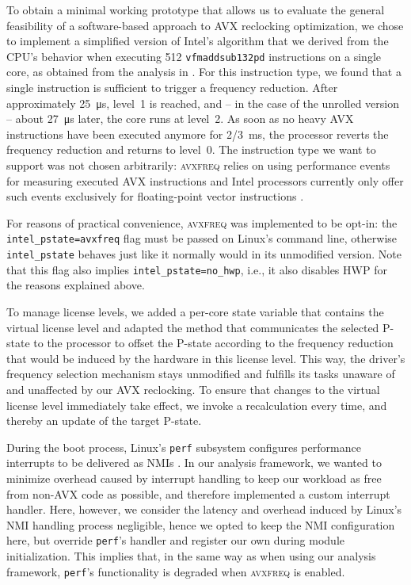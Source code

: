 To obtain a minimal working prototype that allows us to evaluate the general feasibility of a software-based approach to \gls{AVX} reclocking optimization, we chose to implement a simplified version of Intel's algorithm that we derived from the \gls{CPU}'s behavior when executing \SI[number-unit-product=-]{512}{\bit} \texttt{vfmaddsub132pd} instructions on a single core, as obtained from the analysis in . For this instruction type, we found that a single instruction is sufficient to trigger a frequency reduction. After approximately \SI{25}{\micro\second}, level~1 is reached, and -- in the case of the unrolled version -- about \SI{27}{\micro\second} later, the core runs at level~2. As soon as no heavy \gls{AVX} instructions have been executed anymore for \SI[quotient-mode=fraction]{2/3}{\milli\second}, the processor reverts the frequency reduction and returns to level~0. The instruction type we want to support was not chosen arbitrarily: \textsc{avxfreq} relies on using performance events for measuring executed \gls{AVX} instructions and Intel processors currently only offer such events exclusively for floating-point vector instructions \cite{intelsdmmsrs}.

For reasons of practical convenience, \textsc{avxfreq} was implemented to be opt-in: the \texttt{intel\_pstate=avxfreq} flag must be passed on \gls{Linux}'s command line, otherwise \texttt{intel\_pstate} behaves just like it normally would in its unmodified version. Note that this flag also implies \texttt{intel\_pstate=no\_hwp}, i.e., it also disables \gls{HWP} for the reasons explained above.

To manage license levels, we added a per-core state variable that contains the virtual license level and adapted the method that communicates the selected \gls{P-state} to the processor to offset the \gls{P-state} according to the frequency reduction that would be induced by the hardware in this license level. This way, the driver's frequency selection mechanism stays unmodified and fulfills its tasks unaware of and unaffected by our \gls{AVX} reclocking. To ensure that changes to the virtual license level immediately take effect, we invoke a recalculation every time, and thereby an update of the target \gls{P-state}.

During the boot process, \gls{Linux}'s \texttt{perf} subsystem configures performance interrupts to be delivered as \glspl{NMI} \cite{kernelx86eventscore}. In our analysis framework, we wanted to minimize overhead caused by interrupt handling to keep our workload as free from non-\gls{AVX} code as possible, and therefore implemented a custom interrupt handler. Here, however, we consider the latency and overhead induced by Linux's \gls{NMI} handling process negligible, hence we opted to keep the \gls{NMI} configuration here, but override \texttt{perf}'s handler and register our own during module initialization. This implies that, in the same way as when using our analysis framework, \texttt{perf}'s functionality is degraded when \textsc{avxfreq} is enabled.

